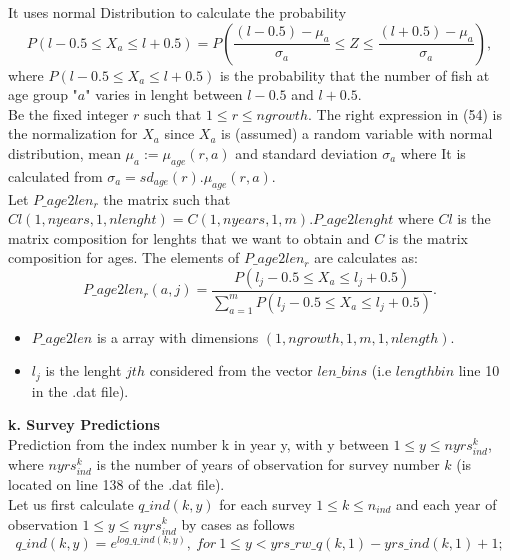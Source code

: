 \documentclass{article}
\begin{document}
It uses normal Distribution to calculate the probability 
\begin{equation}
    P(l-0.5\leq X_a\leq l+0.5 ) = P\left(\dfrac{(l-0.5)-\mu_a}{\sigma_a}\leq Z\leq\dfrac{(l+0.5)-\mu_a}{\sigma_a}\right),
\end{equation}
where $P(l-0.5\leq X_a\leq l+0.5 )$ is the probability that the number of fish at age group "$a$" varies in lenght between  $l-0.5$ and $l+0.5$.\\Be the fixed integer $r$ such that $1\leq r \leq ngrowth$.
The right expression in (54) is the normalization for $X_a$ since $X_a$ is (assumed) a random variable with normal distribution, mean $\mu_a:=\mu_{age}(r,a)$ and  standard deviation $\sigma_a$ where It is calculated from $\sigma_{a}=sd_{age}(r).\mu_{age}(r,a)$.\\

Let $P\_age2len_r$ the matrix such that $Cl(1,nyears,1,nlenght)=C(1,nyears,1,m).P\_age2lenght$ where $Cl$ is the matrix composition for lenghts that we want to obtain and $C$ is the matrix composition for ages. The elements of $P\_age2len_r$ are calculates as:
\begin{equation}
    P\_age2len_r(a,j) = \dfrac{P(l_j-0.5\leq X_a\leq l_j+0.5 )}{\displaystyle\sum_{a=1}^mP(l_j-0.5\leq X_a\leq l_j+0.5 )}.
\end{equation}

\begin{itemize}
    \item $P\_age2len$ is a array with dimensions  $(1,ngrowth,1,m,1,nlength)$.
\end{itemize}
\begin{itemize}
    \item $l_j$ is the lenght $jth$ considered from the vector $len\_bins$ (i.e $lengthbin$ line 10 in the .dat file).
\end{itemize}

\textbf{k. Survey Predictions}\\

Prediction from the index number k in year y, with y between $1\leq y \leq nyrs_{ind}^k$, where $nyrs_{ind}^k$ is the number of years of observation for survey number $k$ (is located on line 138 of the .dat file).\\
Let us first calculate $q\_ind(k,y)$ for each survey $1\leq k \leq n_{ind}$ and each year of observation $1\leq y \leq nyrs_{ind}^k$ by cases as follows
\begin{equation}
q\_ind(k,y)=e^{log\_q\_ind(k,y)}, \ for \ 1\leq y < yrs\_rw\_q(k,1)-yrs\_ind(k,1)+1;
\end{equation}
\end{document}
